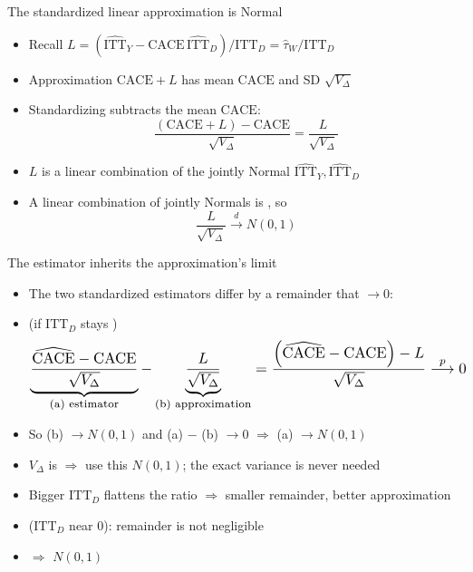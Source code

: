 \documentclass[table, xcolor = {dvipsnames}, 9pt]{beamer}
\theoremstyle{plain}
\newcommand{\mh}[1]{{\color{magenta}{#1}}}
\newcommand{\ITTD}{\mathrm{ITT}_D}
\newcommand{\CACE}{\mathrm{CACE}}
\newcommand{\hITTY}{\widehat{\mathrm{ITT}}_Y}
\newcommand{\hITTD}{\widehat{\mathrm{ITT}}_D}
\begin{document}
\begin{frame}[t]{The standardized linear approximation is Normal}
\vfill
\begin{itemize} \vfill
\item Recall $L = \left(\hITTY - \CACE\,\hITTD\right) / \ITTD = \widehat{\tau}_W / \ITTD$ \vfill
\item Approximation $\CACE + L$ has mean $\CACE$ and SD $\sqrt{V_\Delta}$ \vfill 
\item Standardizing subtracts the mean $\CACE$: \vfill
\vfill
\begin{equation*}
\frac{\left(\CACE + L\right) - \CACE}{\sqrt{V_\Delta}} = \frac{L}{\sqrt{V_\Delta}}
\end{equation*} \vfill
\item $L$ is a linear combination of the jointly Normal $\hITTY, \hITTD$ \vfill
\item A linear combination of jointly Normals is \mh{Normal}, so \vfill
\vfill
\begin{equation*}
\frac{L}{\sqrt{V_\Delta}} \overset{d}{\longrightarrow} N(0, 1)
\end{equation*} \vfill
\end{itemize} \vfill
\end{frame}
\begin{frame}[t]{The estimator inherits the approximation's limit}
\vfill
\begin{itemize} \vfill
\item The two standardized estimators differ by a remainder that $\to 0$: \vfill
\item[] (if $\ITTD$ stays \mh{bounded away from $0$}) \vfill
\vfill
\begin{equation*}
\resizebox{\linewidth}{!}{$\displaystyle \underbrace{\frac{\widehat{\CACE} - \CACE}{\sqrt{V_\Delta}}}_{\text{(a) estimator}} - \underbrace{\frac{L}{\sqrt{V_\Delta}}}_{\text{(b) approximation}} = \frac{\left(\widehat{\CACE} - \CACE\right) - L}{\sqrt{V_\Delta}} \overset{p}{\longrightarrow} 0$}
\end{equation*} \vfill
\item So (b) $\to N(0, 1)$ and (a) $-$ (b) $\to 0$ $\Rightarrow$ (a) $\to N(0, 1)$ \vfill
\item $V_\Delta$ is \mh{computable} $\Rightarrow$ use this $N(0, 1)$; the exact variance is never needed \vfill
\item Bigger $\ITTD$ flattens the ratio $\Rightarrow$ smaller remainder, better approximation \vfill
\item[] \mh{Weak first stage} ($\ITTD$ near $0$): remainder is not negligible \vfill
\item[] $\Rightarrow$ $N(0,1)$ \mh{invalid} \vfill
\end{itemize} \vfill
\end{frame}
\end{document}
